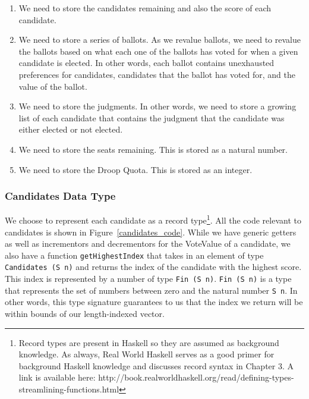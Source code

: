 \begin{enumerate}
	\item We need to store the candidates remaining and also the score of each
	      candidate.
	\item We need to store a series of ballots. As we revalue ballots, we need
	      to revalue the ballots based on what each one of the ballots has voted for
	      when a given candidate is elected. In other words, each ballot contains
	      unexhausted preferences for candidates, candidates that the ballot has voted
	      for, and the value of the ballot.
	\item We need to store the judgments. In other words, we need to store a
	      growing list of each candidate that contains the judgment that the candidate
	      was either elected or not elected.
	\item We need to store the seats remaining. This is stored as a natural
    number. 
    \item We need to store the Droop Quota. This is stored as an integer. 
\end{enumerate}

\subsubsection{Candidates Data Type}

We choose to represent each candidate as a record type\footnote{Record types are
present in Haskell so they are assumed as background knowledge. As always, Real
World Haskell serves as a good primer for background Haskell knowledge and
discusses record syntax in Chapter 3. A link is available here:
http://book.realworldhaskell.org/read/defining-types-streamlining-functions.html}.
All the code relevant to candidates is shown in Figure~\ref{candidates_code}.
While we have generic getters as well as incrementors and decrementors for the
VoteValue of a candidate, we also have a function \texttt{getHighestIndex} that
takes in an element of type \texttt{Candidates (S n)} and returns the index of
the candidate with the highest score. This index is represented by a number of
type \texttt{Fin (S n)}. \texttt{Fin (S n)} is a type that represents the set of
numbers between zero and the natural number \texttt{S n}. In other words, this
type signature guarantees to us that the index we return will be within bounds
of our length-indexed vector.

